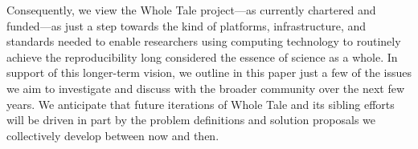 Consequently, we view the Whole Tale project---as currently chartered and funded---as just a step
	towards the kind of platforms, infrastructure, and standards
	needed to enable researchers using computing technology to routinely 
	achieve the reproducibility long considered the essence of science as a whole.
In support of this longer-term vision, we outline in this paper just a few of the issues
	we aim to investigate and discuss with the broader community over the next few years.
We anticipate that future iterations of Whole Tale and its sibling efforts 
	will be driven in part by the problem definitions and solution proposals we collectively
	develop between now and then.
